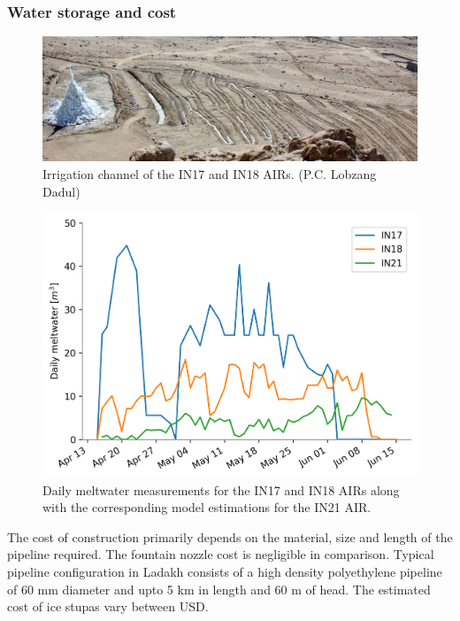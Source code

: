 \subsubsection{Water storage and cost}

\begin{figure}[htb]
\centering
\includegraphics[width=12cm]{figs/IS_irrigation.jpeg}

\caption{Irrigation channel of the IN17 and IN18 AIRs. (P.C. Lobzang Dadul) }

\label{fig:ISirrigation}
\end{figure}

\begin{figure}[htb]
\centering
\includegraphics[width=12cm]{figs/melt.png}

\caption{Daily meltwater measurements for the IN17 and IN18 AIRs along with the corresponding model estimations
for the IN21 AIR. }

\label{fig:ISmelt}
\end{figure}

The cost of construction primarily depends on the material, size and length of the pipeline required. The
fountain nozzle cost is negligible in comparison. Typical pipeline configuration in Ladakh consists of a high
density polyethylene pipeline of 60 mm diameter and upto 5 km in length and 60 m of head. The estimated cost
of ice stupas vary between USD.

